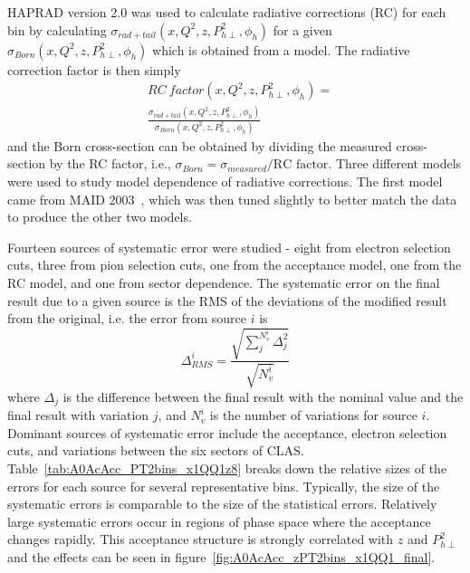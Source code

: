 \documentclass[aps,prl,twocolumn,showpacs,superscriptaddress,groupedaddress]{revtex4-1}  %
\begin{document}
HAPRAD version 2.0 \cite{Akushevich:1999hz,Akushevich:2007jc} was used to calculate radiative corrections (RC) for each bin by calculating $\sigma_{rad+tail} \left( x, Q^2, z, P_{h\perp}^2, \phi_h \right)$ for a given \allowbreak $\sigma_{Born} \left( x, Q^2, z, P_{h\perp}^2, \phi_h \right)$ which is obtained from a model.
The radiative correction factor is then simply
\begin{equation}
\begin{split}
\label{eq:RCfactor}
& RC\ factor \left( x, Q^2, z, P_{h\perp}^2, \phi_h \right) =
\\
& \frac{\sigma_{rad+tail} \left( x, Q^2, z, P_{h\perp}^2, \phi_h \right)}{\sigma_{Born} \left( x, Q^2, z, P_{h\perp}^2, \phi_h \right)}
\end{split}
\end{equation}
and the Born cross-section can be obtained by dividing the measured cross-section by the RC factor, i.e., $\sigma_{Born} = \sigma_{measured}/\text{RC factor}$.
Three different models were used to study model dependence of radiative corrections.
The first model came from MAID 2003~\cite{Drechsel:1999}, which was then tuned slightly to better match the data to produce the other two models.

Fourteen sources of systematic error were studied - eight from electron selection cuts, three from pion selection cuts, one from the acceptance model, one from the RC model, and one from sector dependence.
The systematic error on the final result due to a given source is the RMS of the deviations of the modified result from the original, i.e. the error from source $i$ is
%
\begin{equation}
\label{eq:RMS}
\Delta_{RMS}^i = \frac{\sqrt{\sum_j^{N_v^i} \Delta_j^2}}{\sqrt{N_v^i}}
\end{equation}
%
where $\Delta_j$ is the difference between the final result with the nominal value and the final result with variation $j$, and $N_v^i$ is the number of variations for source $i$.
Dominant sources of systematic error include the acceptance, electron selection cuts, and variations between the six sectors of CLAS.
Table~\ref{tab:A0AcAcc_PT2bins_x1QQ1z8} breaks down the relative sizes of the errors for each source for several representative bins.
Typically, the size of the systematic errors is comparable to the size of the statistical errors.
Relatively large systematic errors occur in regions of phase space where the acceptance changes rapidly.
This acceptance structure is strongly correlated with $z$ and $P_{h\perp}^2$ and the effects can be seen in figure~\ref{fig:A0AcAcc_zPT2bins_x1QQ1_final}.
\end{document}
